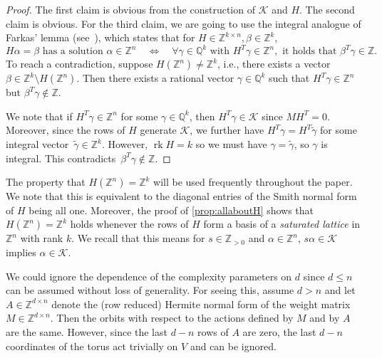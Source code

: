 \documentclass[a4paper,USenglish,cleveref,numberwithinsect]{lipics-v2021}
\DeclareMathOperator{\rk}{rk}
\newcommand{\QQ}{\mathbb{Q}}
\newcommand{\ZZ}{\mathbb{Z}}
\numberwithin{equation}{section}
\begin{document}
\begin{proof}
The first claim is obvious from the construction of $\mathcal{K}$ and $H$.
The second claim is obvious. %
For the third claim, we are going to use the integral analogue of Farkas' lemma
(see~\cite[Corollary~4.1a]{integer-farkas}), which states that for $H\in\ZZ^{k\times n}, \beta\in\ZZ^k$,
\[
	H \alpha = \beta \text{ has a solution }\alpha\in\ZZ^n \quad \iff\quad \forall \gamma\in\QQ^k
     \text{ with }H^T \gamma\in\ZZ^n, \text{ it holds that } \beta^T \gamma\in\ZZ.
\]
To reach a contradiction, suppose $H(\ZZ^n)\neq\ZZ^k$, i.e., there exists a vector $\beta\in\ZZ^k\setminus H(\ZZ^n)$.
Then there exists a rational vector $\gamma\in\QQ^k$ such that $H^T \gamma\in\ZZ^n$ but $\beta^T \gamma\not\in\ZZ$.

We note that if $H^T\gamma\in\ZZ^n$ for some $\gamma\in\QQ^k$, then $H^T\gamma\in\mathcal{K}$ since $MH^T=0$.
Moreover, since the rows of $H$ generate $\mathcal{K}$,
we further have $H^T \gamma = H^T \tilde{\gamma}$ for some integral vector~$\tilde{\gamma}\in\ZZ^k$.
However, $\rk H=k$ so we must have $\gamma=\tilde{\gamma}$, so $\gamma$ is integral.
This contradicts~$\beta^T \gamma\not\in\ZZ$.
\end{proof}

\begin{remark}
The property that $H(\ZZ^n)=\ZZ^k$ will be used frequently throughout the paper.
We note that this is equivalent to the diagonal entries of the Smith normal form of $H$ being all one. Moreover, the proof of \cref{prop:allaboutH} shows that $H(\ZZ^n)=\ZZ^k$ holds whenever
the rows of $H$ form a basis of a \emph{saturated lattice} in $\ZZ^n$ with rank $k$. We recall that this means for $s\in\ZZ_{>0}$ and $\alpha\in\ZZ^n$, $s\alpha\in\mathcal{K}$ implies $\alpha\in\mathcal{K}$.
\end{remark}


\begin{remark}
We could ignore the dependence of the complexity parameters on $d$
since $d\leq n$  can be assumed  without loss of generality.
For seeing this, assume $d>n$ and let
$A\in\ZZ^{d\times n}$ denote the (row reduced) Hermite normal form of
the weight matrix $M\in\ZZ^{d\times n}$.
Then the orbits with respect to the actions defined by $M$ and by $A$ are the same.
However, since the last $d-n$ rows of $A$ are zero,
the last $d-n$ coordinates of the torus act trivially on $V$
and can be ignored.
\end{remark}
\end{document}
